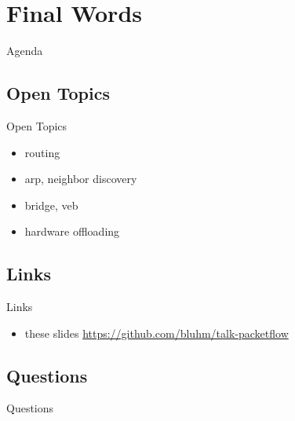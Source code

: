\documentclass[14pt]{beamer}
\begin{document}
\section{Final Words}
\begin{frame}{Agenda}
\tableofcontents[currentsection]
\end{frame}

\subsection{Open Topics}
\begin{frame}{Open Topics}
\begin{itemize}
  \item routing
  \item arp, neighbor discovery
  \item bridge, veb
  \item hardware offloading
\end{itemize}
\end{frame}

\subsection{Links}
\begin{frame}{Links}
\begin{itemize}
  \item these slides
    {\small \url{https://github.com/bluhm/talk-packetflow}}
\end{itemize}
\end{frame}

\subsection{Questions}
\begin{frame}{Questions}
\begin{center}
\end{center}
\end{frame}
\end{document}
